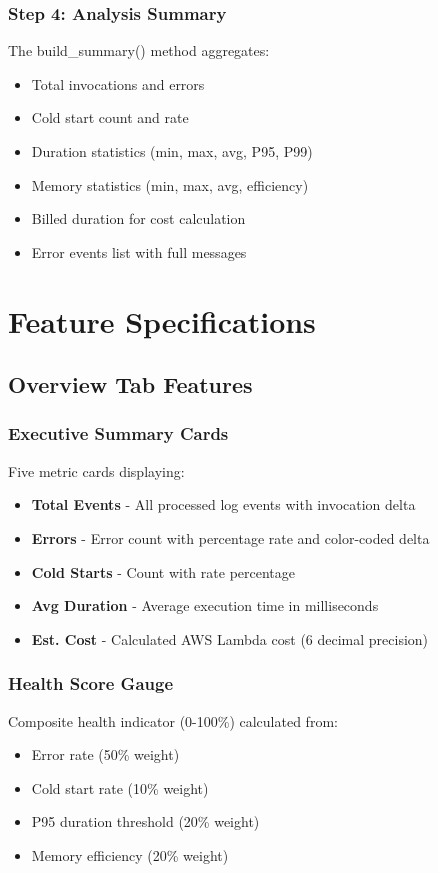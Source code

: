 \documentclass[12pt,a4paper]{article}
\begin{document}
\subsubsection{Step 4: Analysis Summary}
The build\_summary() method aggregates:
\begin{itemize}
    \item Total invocations and errors
    \item Cold start count and rate
    \item Duration statistics (min, max, avg, P95, P99)
    \item Memory statistics (min, max, avg, efficiency)
    \item Billed duration for cost calculation
    \item Error events list with full messages
\end{itemize}

\pagebreak

\section{Feature Specifications}

\subsection{Overview Tab Features}

\subsubsection{Executive Summary Cards}
Five metric cards displaying:
\begin{itemize}
    \item \textbf{Total Events} - All processed log events with invocation delta
    \item \textbf{Errors} - Error count with percentage rate and color-coded delta
    \item \textbf{Cold Starts} - Count with rate percentage
    \item \textbf{Avg Duration} - Average execution time in milliseconds
    \item \textbf{Est. Cost} - Calculated AWS Lambda cost (6 decimal precision)
\end{itemize}

\subsubsection{Health Score Gauge}
Composite health indicator (0-100\%) calculated from:
\begin{itemize}
    \item Error rate (50\% weight)
    \item Cold start rate (10\% weight)
    \item P95 duration threshold (20\% weight)
    \item Memory efficiency (20\% weight)
\end{itemize}
\end{document}
